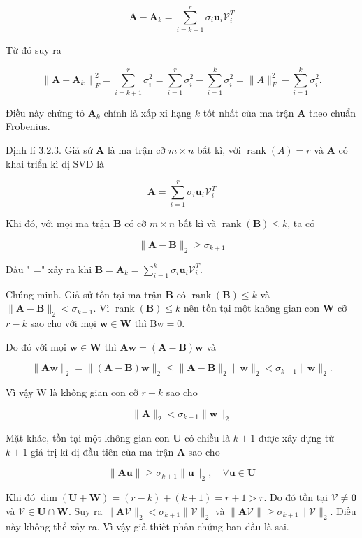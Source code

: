 \documentclass[12pt,a4paper,oneside]{report}
\numberwithin{equation}{section}
\begin{document}
$$
\mathbf{A}-\mathbf{A}_{k}=\sum_{i=k+1}^{r} \sigma_{i} \mathbf{u}_{i} \mathcal{V}_{i}^{T}
$$

Từ đó suy ra

$$
\left\|\mathbf{A}-\mathbf{A}_{k}\right\|_{F}^{2}=\sum_{i=k+1}^{r} \sigma_{i}^{2}=\sum_{i=1}^{r} \sigma_{i}^{2}-\sum_{i=1}^{k} \sigma_{i}^{2}=\|A\|_{F}^{2}-\sum_{i=1}^{k} \sigma_{i}^{2} .
$$

Điều này chứng tỏ $\mathbf{A}_{k}$ chính là xấp xỉ hạng $k$ tốt nhất của ma trận $\mathbf{A}$ theo chuẩn Frobenius.

Định lí 3.2.3. Giả sử $\mathbf{A}$ là ma trận cỡ $m \times n$ bất kì, với $\operatorname{rank}(A)=r$ và $\mathbf{A}$ có khai triển kì dị SVD là

$$
\mathbf{A}=\sum_{i=1}^{r} \sigma_{i} \mathbf{u}_{i} \mathcal{V}_{i}^{T}
$$

Khi đó, với mọi ma trận $\mathbf{B}$ có cỡ $m \times n$ bất kì và $\operatorname{rank}(\mathbf{B}) \leqslant k$, ta có

$$
\|\mathbf{A}-\mathbf{B}\|_{2} \geqslant \sigma_{k+1}
$$

Dấu " =" xảy ra khi $\mathbf{B}=\mathbf{A}_{k}=\sum_{i=1}^{k} \sigma_{i} \mathbf{u}_{i} \mathcal{V}_{i}^{T}$.

Chúng minh. Giả sử tồn tại ma trận $\mathbf{B}$ có $\operatorname{rank}(\mathbf{B}) \leqslant k$ và $\|\mathbf{A}-\mathbf{B}\|_{2}<\sigma_{k+1}$. Vì $\operatorname{rank}(\mathbf{B}) \leqslant k$ nên tồn tại một không gian con $\mathbf{W}$ cỡ $r-k$ sao cho với mọi $\mathbf{w} \in \mathbf{W}$ thì $\mathrm{Bw}=0$.

Do đó với mọi $\mathbf{w} \in \mathbf{W}$ thì $\mathbf{A} \mathbf{w}=(\mathbf{A}-\mathbf{B}) \mathbf{w}$ và

$$
\|\mathbf{A} \mathbf{w}\|_{2}=\|(\mathbf{A}-\mathbf{B}) \mathbf{w}\|_{2} \leqslant\|\mathbf{A}-\mathbf{B}\|_{2}\|\mathbf{w}\|_{2}<\sigma_{k+1}\|\mathbf{w}\|_{2} .
$$

Vì vậy W là không gian con cỡ $r-k$ sao cho

$$
\|\mathbf{A}\|_{2}<\sigma_{k+1}\|\mathbf{w}\|_{2}
$$

Mặt khác, tồn tại một không gian con $\mathbf{U}$ có chiều là $k+1$ được xây dựng từ $k+1$ giá trị kì dị đầu tiên của ma trận $\mathbf{A}$ sao cho

$$
\|\mathbf{A} \mathbf{u}\| \geqslant \sigma_{k+1}\|\mathbf{u}\|_{2}, \quad \forall \mathbf{u} \in \mathbf{U}
$$

Khi đó $\operatorname{dim}(\mathbf{U}+\mathbf{W})=(r-k)+(k+1)=r+1>r$. Do đó tồn tại $\mathcal{V} \neq \mathbf{0}$ và $\mathcal{V} \in \mathbf{U} \cap \mathbf{W}$. Suy ra $\|\mathbf{A} \mathcal{V}\|_{2}<\sigma_{k+1}\|\mathcal{V}\|_{2}$ và $\|\mathbf{A} \mathcal{V}\| \geqslant \sigma_{k+1}\|\mathcal{V}\|_{2}$. Điều này không thể xảy ra. Vì vậy giả thiết phản chứng ban đầu là sai.
\end{document}
